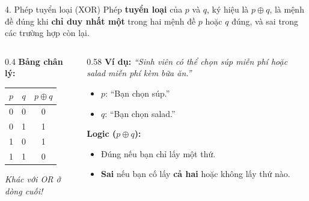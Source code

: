 \documentclass[aspectratio=169, 11pt]{beamer}
\begin{document}
\begin{frame}{4. Phép tuyển loại (XOR)}
Phép \textbf{tuyển loại} của $p$ và $q$, ký hiệu là $p \oplus q$, là mệnh đề đúng khi \textbf{chỉ duy nhất một} trong hai mệnh đề $p$ hoặc $q$ đúng, và sai trong các trường hợp còn lại.

\vspace{0.3cm}
\begin{columns}[t, onlytextwidth]
  \begin{column}{0.4\textwidth}
    \textbf{Bảng chân lý:}
    \vspace{0.2cm}
    \begin{center}
    \begin{tabular}{|c|c|c|}
    \hline
    $p$ & $q$ & $p \oplus q$ \\
    \hline
    0 & 0 & 0 \\
    0 & 1 & 1 \\
    1 & 0 & 1 \\
    1 & 1 & 0 \\
    \hline
    \end{tabular}
    \end{center}
    \vspace{0.1cm}
    \centering
    \textit{Khác với OR ở dòng cuối!}
  \end{column}
  \begin{column}{0.58\textwidth}
    \textbf{Ví dụ:} \textit{``Sinh viên có thể chọn súp miễn phí hoặc salad miễn phí kèm bữa ăn.''}
    \begin{itemize}
      \item $p$: ``Bạn chọn súp.''
      \item $q$: ``Bạn chọn salad.''
    \end{itemize}
    \textbf{Logic ($p \oplus q$):}
    \begin{itemize}
      \item Đúng nếu bạn chỉ lấy một thứ.
      \item \textbf{Sai} nếu bạn cố lấy \textbf{cả hai} hoặc không lấy thứ nào.
    \end{itemize}
  \end{column}
\end{columns}
\end{frame}
\end{document}
